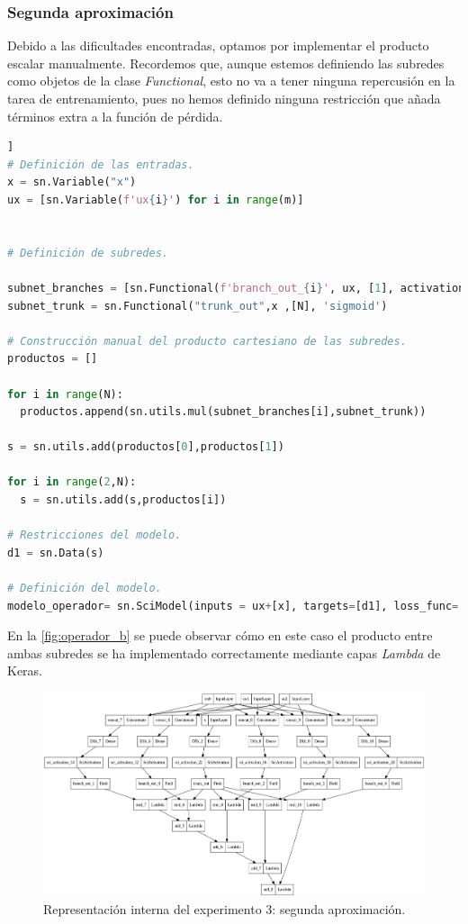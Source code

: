 \subsubsection{Segunda aproximación}\label{sec:8.4.4.2}

Debido a las dificultades encontradas, optamos por implementar el producto escalar manualmente. Recordemos que, aunque estemos definiendo las subredes como objetos de la clase \textit{Functional}, esto no va a tener ninguna repercusión en la tarea de entrenamiento, pues no hemos definido ninguna restricción que añada términos extra a la función de pérdida. 

\begin{lstlisting}[language=Python,caption={Segunda aproximación para el modelo de aprendizaje de operadores.},label={lst:exp3-aprox2}]]
# Definición de las entradas.
x = sn.Variable("x")
ux = [sn.Variable(f'ux{i}') for i in range(m)]


# Definición de subredes.

subnet_branches = [sn.Functional(f'branch_out_{i}', ux, [1], activation='tanh') for i in range(N)]
subnet_trunk = sn.Functional("trunk_out",x ,[N], 'sigmoid')

# Construcción manual del producto cartesiano de las subredes.
productos = []

for i in range(N):
  productos.append(sn.utils.mul(subnet_branches[i],subnet_trunk))

s = sn.utils.add(productos[0],productos[1])

for i in range(2,N):
  s = sn.utils.add(s,productos[i])

# Restricciones del modelo.
d1 = sn.Data(s)

# Definición del modelo.
modelo_operador= sn.SciModel(inputs = ux+[x], targets=[d1], loss_func='MSE',optimizer="adam")
\end{lstlisting}

En la \autoref{fig:operador_b} se puede observar cómo en este caso el producto entre ambas subredes se ha implementado correctamente mediante capas \textit{Lambda} de Keras. 
 \begin{figure}[htbp]
    \centering
    \includegraphics[width=1.1\textwidth]{img/operador_b.png}
    \caption{Representación interna del experimento 3: segunda aproximación.}
    \label{fig:operador_b}
\end{figure}


